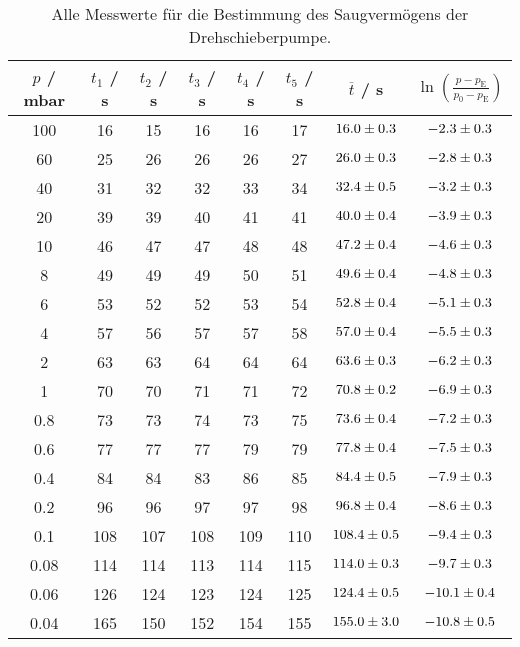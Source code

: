\begin{table} %
  \centering
  \caption{Alle Messwerte für die Bestimmung des Saugvermögens der Drehschieberpumpe.}
  \label{tab:ptdreh}
  \begin{tabular}{c|c|c|c|c|c|c|c}
    $p$ / mbar & $t_1$ / s & $t_2$ / s & $t_3$ / s & $t_4$ / s & $t_5$ / s & $\overline{t}$ / s & $\ln\left( \frac{p-p_\text{E}}{p_0-p_\text{E}} \right)$ \\
    \midrule
    100  & 16  & 15  & 16  & 16  & 17  & $\num{16.0 +- 0.3}$ & $\num{-2.3 +- 0.3}$ \\
    60   & 25  & 26  & 26  & 26  & 27  & $\num{26.0 +- 0.3}$ & $\num{-2.8 +- 0.3}$ \\
    40   & 31  & 32  & 32  & 33  & 34  & $\num{32.4 +- 0.5}$ & $\num{-3.2 +- 0.3}$ \\
    \hline
    20   & 39  & 39  & 40  & 41  & 41  & $\num{40.0 +- 0.4}$ & $\num{-3.9 +- 0.3}$ \\
    10   & 46  & 47  & 47  & 48  & 48  & $\num{47.2 +- 0.4}$ & $\num{-4.6 +- 0.3}$ \\
    8    & 49  & 49  & 49  & 50  & 51  & $\num{49.6 +- 0.4}$ & $\num{-4.8 +- 0.3}$ \\
    6    & 53  & 52  & 52  & 53  & 54  & $\num{52.8 +- 0.4}$ & $\num{-5.1 +- 0.3}$ \\
    4    & 57  & 56  & 57  & 57  & 58  & $\num{57.0 +- 0.4}$ & $\num{-5.5 +- 0.3}$ \\
    2    & 63  & 63  & 64  & 64  & 64  & $\num{63.6 +- 0.3}$ & $\num{-6.2 +- 0.3}$ \\
    \hline
    1    & 70  & 70  & 71  & 71  & 72  & $\num{70.8 +- 0.2}$ & $\num{-6.9 +- 0.3}$ \\
    0.8  & 73  & 73  & 74  & 73  & 75  & $\num{73.6 +- 0.4}$ & $\num{-7.2 +- 0.3}$ \\
    0.6  & 77  & 77  & 77  & 79  & 79  & $\num{77.8 +- 0.4}$ & $\num{-7.5 +- 0.3}$ \\
    0.4  & 84  & 84  & 83  & 86  & 85  & $\num{84.4 +- 0.5}$ & $\num{-7.9 +- 0.3}$ \\
    0.2  & 96  & 96  & 97  & 97  & 98  & $\num{96.8 +- 0.4}$ & $\num{-8.6 +- 0.3}$ \\
    \hline
    0.1  & 108 & 107 & 108 & 109 & 110 & $\num{108.4 +- 0.5}$ & $\num{-9.4 +- 0.3}$ \\
    0.08 & 114 & 114 & 113 & 114 & 115 & $\num{114.0 +- 0.3}$ & $\num{-9.7 +- 0.3}$ \\
    0.06 & 126 & 124 & 123 & 124 & 125 & $\num{124.4 +- 0.5}$ & $\num{-10.1 +- 0.4}$ \\
    0.04 & 165 & 150 & 152 & 154 & 155 & $\num{155.0 +- 3.0}$ & $\num{-10.8 +- 0.5}$ \\
  \end{tabular}
\end{table}

